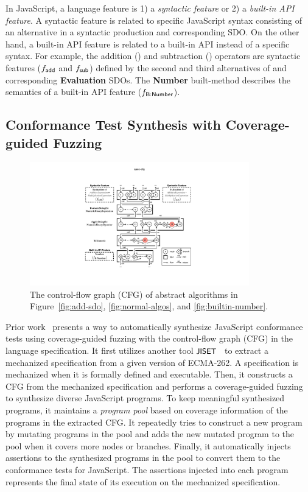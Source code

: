 In JavaScript, a language feature is 1) a \textit{syntactic feature} or 2) a
\textit{built-in API feature}.
%
A syntactic feature is related to specific JavaScript syntax consisting of an
alternative in a syntactic production and corresponding SDO.
%
On the other hand, a built-in API feature is related to a built-in API instead
of a specific syntax.
%
For example, the addition (\scode{+}) and subtraction (\scode{-}) operators are
syntactic features ($f_{\textsf{add}}$ and $f_{\textsf{sub}}$) defined by the second and third
alternatives of  and corresponding \textbf{Evaluation}
SDOs.
%
The \textbf{Number} built-method describes the semantics of a built-in
 API feature  ($f_{\textsf{B:Number}}$).


\subsection{Conformance Test Synthesis with Coverage-guided Fuzzing}

\begin{figure}
  \centering
  \includegraphics[width=0.85\textwidth]{img/spec-cfg}
  \caption{
    The control-flow graph (CFG) of abstract algorithms in
    Figure~\ref{fig:add-sdo}, \ref{fig:normal-algos}, and
    \ref{fig:builtin-number}.
  }
  \label{fig:spec-cfg}
\end{figure}

Prior work~\cite{jest} presents a way to automatically synthesize JavaScript
conformance tests using coverage-guided fuzzing with the control-flow graph
(CFG) in the language specification.
%
It first utilizes another tool $\textsf{\small JISET}$~\cite{jiset} to extract a mechanized
specification from a given version of ECMA-262.
%
A specification is mechanized when it is formally defined and executable.
%
Then, it constructs a CFG from the mechanized specification and performs
a coverage-guided fuzzing~\cite{afl} to synthesize diverse JavaScript programs.
%
To keep meaningful synthesized programs, it maintains a \textit{program pool}
based on coverage information of the programs in the extracted CFG.
%
It repeatedly tries to construct a new program by mutating programs in the pool
and adds the new mutated program to the pool when it covers more nodes or
branches.
%
Finally, it automatically injects assertions to the synthesized programs in the
pool to convert them to the conformance tests for JavaScript.
%
The assertions injected into each program represents the final state of its
execution on the mechanized specification.

